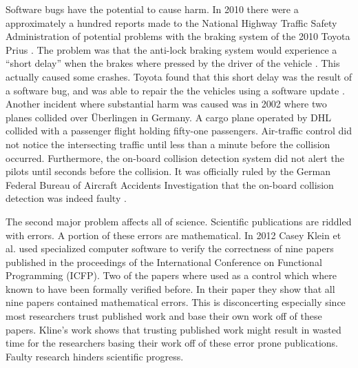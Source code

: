 Software bugs have the potential to cause harm.  In 2010 there were a
approximately a hundred reports made to the National Highway Traffic
Safety Administration of potential problems with the braking system of
the 2010 Toyota Prius \cite{Consumer:2010}.  The problem was that the
anti-lock braking system would experience a ``short delay'' when
the brakes where pressed by the driver of the vehicle
\cite{thedetroitbureau.com:2009}.  This actually caused some crashes.
Toyota found that this short delay was the result of a software bug,
and was able to repair the the vehicles using a software update
\cite{Reuters:2009}.  Another incident where substantial harm was
caused was in 2002 where two planes collided over \"{U}berlingen in
Germany. A cargo plane operated by DHL collided with a passenger
flight holding fifty-one passengers.  Air-traffic control did not
notice the intersecting traffic until less than a minute before the
collision occurred.  Furthermore, the on-board collision detection
system did not alert the pilots until seconds before the collision.
It was officially ruled by the German Federal Bureau of Aircraft
Accidents Investigation that the on-board collision detection was
indeed faulty \cite{Collision:2004}.

The second major problem affects all of science.  Scientific
publications are riddled with errors.  A portion of these errors are
mathematical.  In 2012 Casey Klein et al. used specialized computer
software to verify the correctness of nine papers published in the
proceedings of the International Conference on Functional Programming
(ICFP).  Two of the papers where used as a control which where known
to have been formally verified before.  In their paper
\cite{Klein:2012} they show that all nine papers contained
mathematical errors.  This is disconcerting especially since most
researchers trust published work and base their own work off of these
papers.  Kline's work shows that trusting published work might result
in wasted time for the researchers basing their work off of these
error prone publications.  Faulty research hinders scientific
progress.

